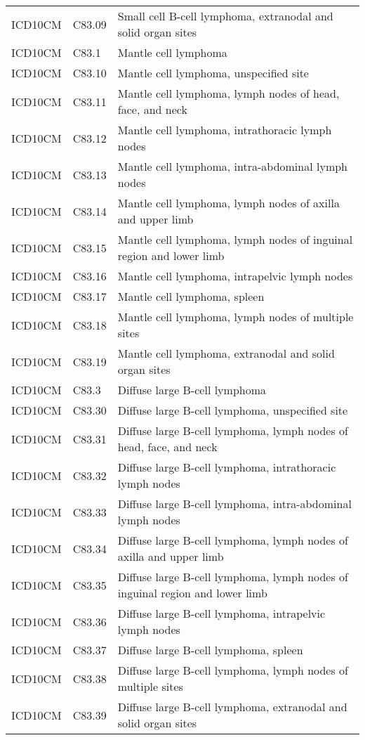 \begin{table}[ht]
\begin{tabular}{lll}
  ICD10CM & C83.09 & Small cell B-cell lymphoma, extranodal and solid organ sites \\ 
  ICD10CM & C83.1 & Mantle cell lymphoma \\ 
  ICD10CM & C83.10 & Mantle cell lymphoma, unspecified site \\ 
  ICD10CM & C83.11 & Mantle cell lymphoma, lymph nodes of head, face, and neck \\ 
  ICD10CM & C83.12 & Mantle cell lymphoma, intrathoracic lymph nodes \\ 
  ICD10CM & C83.13 & Mantle cell lymphoma, intra-abdominal lymph nodes \\ 
  ICD10CM & C83.14 & Mantle cell lymphoma, lymph nodes of axilla and upper limb \\ 
  ICD10CM & C83.15 & Mantle cell lymphoma, lymph nodes of inguinal region and lower limb \\ 
  ICD10CM & C83.16 & Mantle cell lymphoma, intrapelvic lymph nodes \\ 
  ICD10CM & C83.17 & Mantle cell lymphoma, spleen \\ 
  ICD10CM & C83.18 & Mantle cell lymphoma, lymph nodes of multiple sites \\ 
  ICD10CM & C83.19 & Mantle cell lymphoma, extranodal and solid organ sites \\ 
  ICD10CM & C83.3 & Diffuse large B-cell lymphoma \\ 
  ICD10CM & C83.30 & Diffuse large B-cell lymphoma, unspecified site \\ 
  ICD10CM & C83.31 & Diffuse large B-cell lymphoma, lymph nodes of head, face, and neck \\ 
  ICD10CM & C83.32 & Diffuse large B-cell lymphoma, intrathoracic lymph nodes \\ 
  ICD10CM & C83.33 & Diffuse large B-cell lymphoma, intra-abdominal lymph nodes \\ 
  ICD10CM & C83.34 & Diffuse large B-cell lymphoma, lymph nodes of axilla and upper limb \\ 
  ICD10CM & C83.35 & Diffuse large B-cell lymphoma, lymph nodes of inguinal region and lower limb \\ 
  ICD10CM & C83.36 & Diffuse large B-cell lymphoma, intrapelvic lymph nodes \\ 
  ICD10CM & C83.37 & Diffuse large B-cell lymphoma, spleen \\ 
  ICD10CM & C83.38 & Diffuse large B-cell lymphoma, lymph nodes of multiple sites \\ 
  ICD10CM & C83.39 & Diffuse large B-cell lymphoma, extranodal and solid organ sites \\ 

\end{tabular}
\end{table}
